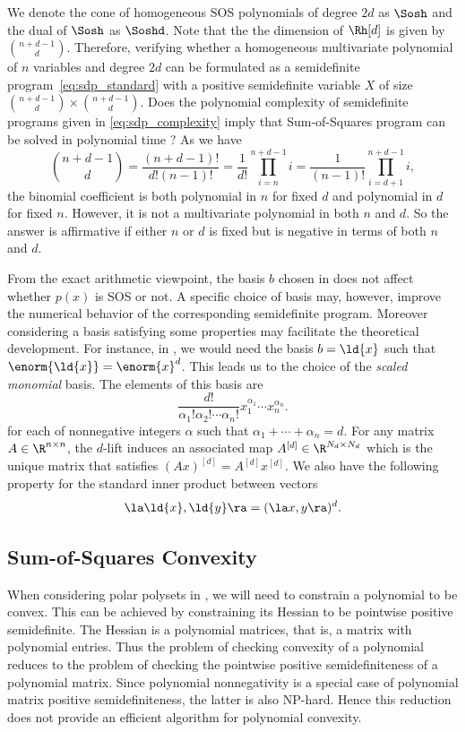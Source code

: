 \documentclass[11pt,twoside,a4paper,openright]{uclouvain-thesis}
\begin{document}
We denote the cone of homogeneous SOS polynomials of degree $2d$ as
$\Sosh$ and the dual of $\Sosh$ as $\Soshd$.
Note that the the dimension of $\Rh[d]$ is given by ${n+d-1 \choose d}$.
Therefore, verifying whether a homogeneous multivariate polynomial
of $n$ variables and degree $2d$ can be formulated as a semidefinite program~\eqref{eq:sdp_standard}
with a positive semidefinite variable $X$ of size ${n+d-1 \choose d} \times {n+d-1 \choose d}$.
Does the polynomial complexity of semidefinite programs given in \eqref{eq:sdp_complexity} imply that Sum-of-Squares program can be solved in polynomial time ?
As we have
\[
  {n+d-1 \choose d} = \frac{(n+d-1)!}{d!(n-1)!} = \frac{1}{d!} \prod_{i=n}^{n+d-1} i = \frac{1}{(n-1)!} \prod_{i=d+1}^{n+d-1} i,
\]
the binomial coefficient is both polynomial in $n$ for fixed $d$ and polynomial in $d$ for fixed $n$.
However, it is not a multivariate polynomial in both $n$ and $d$.
So the answer is affirmative if either $n$ or $d$ is fixed but is negative in terms of both $n$ and $d$.

From the exact arithmetic viewpoint, the basis $b$ chosen in  does not affect whether $p(x)$ is SOS or not.
A specific choice of basis may, however, improve the numerical behavior of the corresponding semidefinite program.
Moreover considering a basis satisfying some
properties may facilitate the theoretical development.
For instance, in , we would need the basis $b = \ld{x}$ such that
$\enorm{\ld{x}} = \enorm{x}^d$.
This leads us to the choice of the \emph{scaled monomial} basis.
The elements of this basis are
\[ \frac{d!}{\alpha_1!\alpha_2!\cdots\alpha_n!} x_1^{\alpha_1} \cdots x_n^{\alpha_n}. \]
for each  of nonnegative integers $\alpha$ such that
$\alpha_1 + \cdots + \alpha_n = d$.
For any matrix $A \in \R^{n \times n}$, the $d$-lift induces an
associated map $A^{[d]} \in \R^{N_d \times N_d}$ which is the unique
matrix that satisfies $(Ax)^{[d]} = A^{[d]}x^{[d]}$.
We also have the following property for the standard inner product
between vectors
\begin{equation}
  \label{eq:liftscalprod}
  \la \ld{x}, \ld{y} \ra = (\la x, y \ra)^d.
\end{equation}

\subsection{Sum-of-Squares Convexity}
\label{sec:sosconv}
When considering polar polysets in , we will need to constrain a polynomial to be convex.
This can be achieved by constraining its Hessian to be pointwise positive semidefinite.
The Hessian is a polynomial matrices, that is, a matrix with polynomial entries.
Thus the problem of checking convexity of a polynomial reduces to the problem of checking the pointwise positive semidefiniteness of a polynomial matrix.
Since polynomial nonnegativity is a special case of polynomial matrix positive semidefiniteness, the latter is also NP-hard.
Hence this reduction does not provide an efficient algorithm for polynomial convexity.
\end{document}

